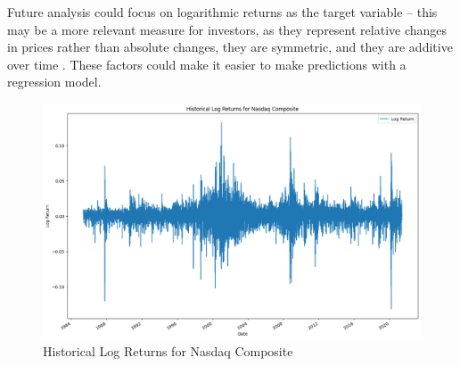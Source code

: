 \documentclass[a4paper, 11pt]{article}
\begin{document}
Future analysis could focus on logarithmic returns as the target variable -- this may be a more relevant measure for investors, as they represent relative changes in prices rather than absolute changes, they are symmetric, and they are additive over time \cite{whyLogReturns}. These factors could make it easier to make predictions with a regression model.

\begin{figure}[H]
    \begin{center}
        \includegraphics[width=1\textwidth]{Historical Log Returns for Nasdaq Composite.png}
        \caption{Historical Log Returns for Nasdaq Composite}
    \end{center}
\end{figure}



\end{document}
